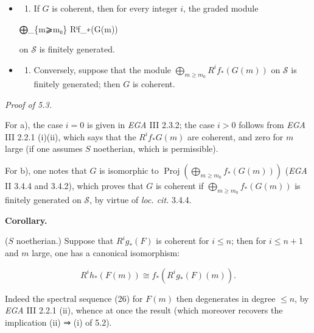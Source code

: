 \documentclass[
]{article}
\newenvironment{Shaded}{}{}
\newcommand{\NormalTok}[1]{#1}
\providecommand{\tightlist}{%
  \setlength{\itemsep}{0pt}\setlength{\parskip}{0pt}}
\begin{document}
\begin{itemize}
\item
  \begin{enumerate}
  \def\labelenumi{\alph{enumi})}
  \tightlist
  \item
    If \(G\) is coherent, then for every integer \(i\), the graded
    module
  \end{enumerate}

\begin{Shaded}
\begin{Highlighting}[]
\NormalTok{⨁\_\{m⩾m₀\} Rⁱf\_∗(G(m))}
\end{Highlighting}
\end{Shaded}

  on \(\mathcal{S}\) is finitely generated.
\item
  \begin{enumerate}
  \def\labelenumi{\alph{enumi})}
  \setcounter{enumi}{1}
  \tightlist
  \item
    Conversely, suppose that the module
    \(\bigoplus_{m\geqslant m_{0}} R^{i}f_{\ast}(G(m))\) on
    \(\mathcal{S}\) is finitely generated; then \(G\) is coherent.
  \end{enumerate}
\end{itemize}

\emph{Proof of 5.3.}

For a), the case \(i = 0\) is given in \emph{EGA} III 2.3.2; the case
\(i > 0\) follows from \emph{EGA} III 2.2.1 (i)(ii), which says that the
\(R^{i}f_{\ast} G(m)\) are coherent, and zero for \(m\) large (if one
assumes \(S\) noetherian, which is permissible).

For b), one notes that \(G\) is isomorphic to
\(\operatorname{Proj}(\bigoplus_{m\geqslant m_{0}} f_{\ast}(G(m)))\)
(\emph{EGA} II 3.4.4 and 3.4.2), which proves that \(G\) is coherent if
\(\bigoplus_{m\geqslant m_{0}} f_{\ast}(G(m))\) is finitely generated on
\(\mathcal{S}\), by virtue of \emph{loc. cit.} 3.4.4.

\textbf{Corollary.}

(\(S\) noetherian.) Suppose that \(R^{i}g_{\ast}(F)\) is coherent for
\(i \leqslant n\); then for \(i \leqslant n + 1\) and \(m\) large, one
has a canonical isomorphism:

\[
R^{i}h_{\ast}(F(m)) \cong f_{\ast}(R^{i}g_{\ast}(F)(m)).
\]

Indeed the spectral sequence (26) for \(F(m)\) then degenerates in
degree \(\leqslant n\), by \emph{EGA} III 2.2.1 (ii), whence at once the
result (which moreover recovers the implication (ii) ⇒ (i) of 5.2).
\end{document}
